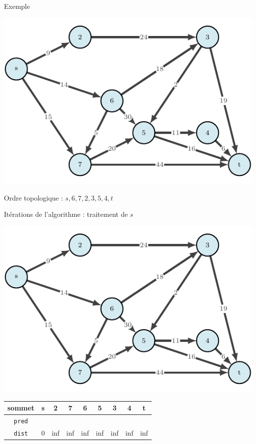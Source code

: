 \begin{frame}{Exemple}
    \begin{center}
        \includegraphics[height=.6\textheight]{fig/ordinal-0.pdf}

        Ordre topologique : $s,6,7,2,3,5,4,t$
    \end{center}
\end{frame}

\begin{frame}{Itérations de l'algorithme : traitement de $s$}
    \begin{center}
        \includegraphics[height=.6\textheight]{fig/ordinal-0.pdf}      
    \begin{tabular}{c|cccccccc}
        
        sommet & s       &2      &7      &6      &5      &3      &4      &t      \\
        \hline
        \texttt{pred} & &       &       &       &       &       &       &       \\
        \texttt{dist} & 0       &inf    &inf    &inf    &inf    &inf    &inf    &inf    \\
    \end{tabular}
\end{center}
\end{frame}

